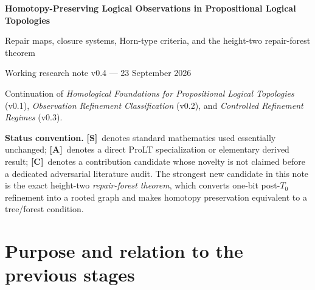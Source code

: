 \documentclass[11pt]{article}
\theoremstyle{definition}
\newcommand{\statusS}{\textbf{[S]}}
\newcommand{\statusA}{\textbf{[A]}}
\newcommand{\statusC}{\textbf{[C]}}
\begin{document}
\begin{center}
{\LARGE\bfseries\color{navy} Homotopy-Preserving Logical Observations in Propositional Logical Topologies}\par
\vspace{0.35em}
{\large Repair maps, closure systems, Horn-type criteria, and the height-two repair-forest theorem}\par
\vspace{0.7em}
{\normalsize Working research note v0.4 --- 23 September 2026}\par
\vspace{0.3em}
{\small Continuation of \emph{Homological Foundations for Propositional Logical Topologies} (v0.1), \emph{Observation Refinement Classification} (v0.2), and \emph{Controlled Refinement Regimes} (v0.3).}
\end{center}

\vspace{0.8em}
\noindent\colorbox{softgold}{\parbox{0.96\textwidth}{
\textbf{Status convention.} \statusS\ denotes standard mathematics used essentially unchanged; \statusA\ denotes a direct ProLT specialization or elementary derived result; \statusC\ denotes a contribution candidate whose novelty is not claimed before a dedicated adversarial literature audit. The strongest new candidate in this note is the exact height-two \emph{repair-forest theorem}, which converts one-bit post-$T_0$ refinement into a rooted graph and makes homotopy preservation equivalent to a tree/forest condition.
}}

\section{Purpose and relation to the previous stages}
\end{document}

